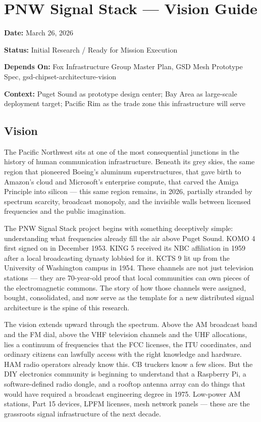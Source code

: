 \documentclass[11pt,letterpaper]{article}
\newcommand{\metafield}[2]{\textbf{\sffamily #1} #2\par}
\begin{document}
\section{PNW Signal Stack --- Vision Guide}

\metafield{Date:}{March 26, 2026}
\metafield{Status:}{Initial Research / Ready for Mission Execution}
\metafield{Depends On:}{Fox Infrastructure Group Master Plan, GSD Mesh Prototype Spec, gsd-chipset-architecture-vision}
\metafield{Context:}{Puget Sound as prototype design center; Bay Area as large-scale deployment target; Pacific Rim as the trade zone this infrastructure will serve}

\subsection{Vision}

The Pacific Northwest sits at one of the most consequential junctions in the history of human communication infrastructure. Beneath its grey skies, the same region that pioneered Boeing's aluminum superstructures, that gave birth to Amazon's cloud and Microsoft's enterprise compute, that carved the Amiga Principle into silicon --- this same region remains, in 2026, partially stranded by spectrum scarcity, broadcast monopoly, and the invisible walls between licensed frequencies and the public imagination.

The PNW Signal Stack project begins with something deceptively simple: understanding what frequencies already fill the air above Puget Sound. KOMO 4 first signed on in December 1953. KING 5 received its NBC affiliation in 1959 after a local broadcasting dynasty lobbied for it. KCTS 9 lit up from the University of Washington campus in 1954. These channels are not just television stations --- they are 70-year-old proof that local communities can own pieces of the electromagnetic commons. The story of how those channels were assigned, bought, consolidated, and now serve as the template for a new distributed signal architecture is the spine of this research.

The vision extends upward through the spectrum. Above the AM broadcast band and the FM dial, above the VHF television channels and the UHF allocations, lies a continuum of frequencies that the FCC licenses, the ITU coordinates, and ordinary citizens can lawfully access with the right knowledge and hardware. HAM radio operators already know this. CB truckers know a few slices. But the DIY electronics community is beginning to understand that a Raspberry Pi, a software-defined radio dongle, and a rooftop antenna array can do things that would have required a broadcast engineering degree in 1975. Low-power AM stations, Part 15 devices, LPFM licenses, mesh network panels --- these are the grassroots signal infrastructure of the next decade.
\end{document}
